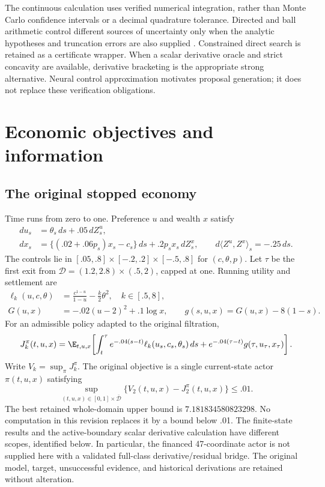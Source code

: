 The continuous calculation uses verified numerical integration, rather than Monte Carlo confidence intervals or a decimal quadrature tolerance. Directed and ball arithmetic control different sources of uncertainty only when the analytic hypotheses and truncation errors are also supplied \citep{Rump2010,Flint2026}. Constrained direct search \citep{KoldaLewisTorczon2003,KoldaLewisTorczon2006,AudetDennis2006} is retained as a certificate wrapper. When a scalar derivative oracle and strict concavity are available, derivative bracketing is the appropriate strong alternative. Neural control approximation \citep{HureEtAl2021,SirignanoSpiliopoulos2018} motivates proposal generation; it does not replace these verification obligations.

\section{Economic objectives and information}
\subsection{The original stopped economy}
Time runs from zero to one. Preference $u$ and wealth $x$ satisfy
\begin{align}
 du_s&=\theta_s\,ds+.05\,dZ_s^u,\\
 dx_s&=\{(.02+.06p_s)x_s-c_s\}\,ds+.2p_sx_s\,dZ_s^x,
 \qquad d\langle Z^u,Z^x\rangle_s=-.25\,ds.
\end{align}
The controls lie in $[.05,.8]\times[-.2,.2]\times[-.5,.8]$ for $(c,\theta,p)$. Let $\tau$ be the first exit from $\mathcal D=(1.2,2.8)\times(.5,2)$, capped at one. Running utility and settlement are
\begin{align}
 \ell_k(u,c,\theta)&=\frac{c^{1-u}}{1-u}-\frac{k}{2}\theta^2,\quad k\in[.5,8],\\
 G(u,x)&=-.02(u-2)^2+.1\log x,\qquad g(s,u,x)=G(u,x)-8(1-s).
\end{align}
For an admissible policy adapted to the original filtration,
\begin{equation}
 J_k^\pi(t,u,x)=\E_{t,u,x}\!\left[\int_t^\tau e^{-.04(s-t)}\ell_k(u_s,c_s,\theta_s)\,ds+e^{-.04(\tau-t)}g(\tau,u_\tau,x_\tau)\right].
\end{equation}
Write $V_k=\sup_\pi J_k^\pi$. The original objective is a single current-state actor $\pi(t,u,x)$ satisfying
\begin{equation}\label{eq:original30}
 \sup_{(t,u,x)\in[0,1]\times\overline{\mathcal D}}\{V_2(t,u,x)-J_2^\pi(t,u,x)\}\le .01.
\end{equation}
The best retained whole-domain upper bound is $7.181834580823298$. No computation in this revision replaces it by a bound below .01. The finite-state results and the active-boundary scalar derivative calculation have different scopes, identified below. In particular, the financed 47-coordinate actor is not supplied here with a validated full-class derivative/residual bridge. The original model, target, unsuccessful evidence, and historical derivations are retained without alteration.

